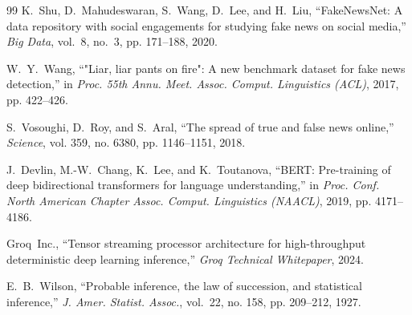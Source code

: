 \documentclass[12pt,a4paper]{report}
\begin{document}
\begin{thebibliography}{99}
K.~Shu, D.~Mahudeswaran, S.~Wang, D.~Lee, and H.~Liu, ``FakeNewsNet: A data repository with social engagements for studying fake news on social media,'' \emph{Big Data}, vol.~8, no.~3, pp. 171--188, 2020.

W.~Y.~Wang, ``"Liar, liar pants on fire": A new benchmark dataset for fake news detection,'' in \emph{Proc. 55th Annu. Meet. Assoc. Comput. Linguistics (ACL)}, 2017, pp. 422--426.

S.~Vosoughi, D.~Roy, and S.~Aral, ``The spread of true and false news online,'' \emph{Science}, vol. 359, no. 6380, pp. 1146--1151, 2018.

J.~Devlin, M.-W.~Chang, K.~Lee, and K.~Toutanova, ``BERT: Pre-training of deep bidirectional transformers for language understanding,'' in \emph{Proc. Conf. North American Chapter Assoc. Comput. Linguistics (NAACL)}, 2019, pp. 4171--4186.

Groq~Inc., ``Tensor streaming processor architecture for high-throughput deterministic deep learning inference,'' \emph{Groq Technical Whitepaper}, 2024.

E.~B.~Wilson, ``Probable inference, the law of succession, and statistical inference,'' \emph{J. Amer. Statist. Assoc.}, vol.~22, no. 158, pp. 209--212, 1927.

\end{thebibliography}
\end{document}
